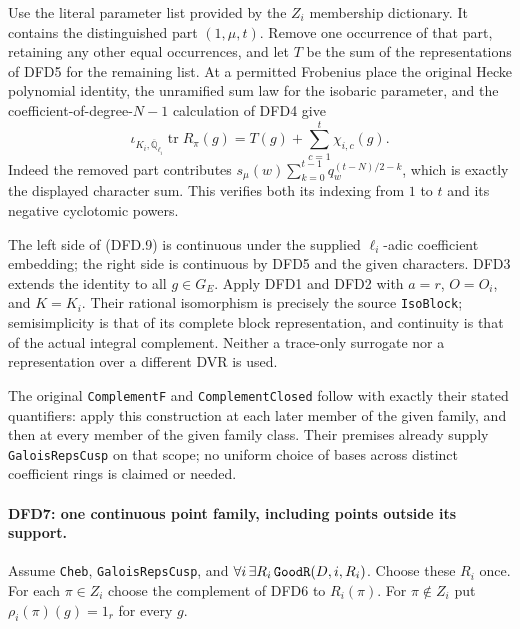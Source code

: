 Use the literal parameter list provided by the $Z_i$ membership
dictionary. It contains the distinguished part $(1,\mu,t)$.
Remove one occurrence of that part, retaining any other equal
occurrences, and let $T$ be the sum of the representations of
DFD5 for the remaining list. At a permitted Frobenius place the
original Hecke polynomial identity, the unramified sum law for
the isobaric parameter, and the coefficient-of-degree-$N-1$
calculation of DFD4 give
\[
 \iota_{K_i,\overline{\mathbb Q}_{\ell_i}}
            \operatorname{tr}R_\pi(g)
       =T(g)+\sum_{c=1}^{t}\chi_{i,c}(g).                \tag{DFD.9}
\]
Indeed the removed part contributes
$s_\mu(w)\sum_{k=0}^{t-1}q_w^{(t-N)/2-k}$, which is exactly
the displayed character sum. This verifies both its indexing
from $1$ to $t$ and its negative cyclotomic powers.

The left side of (DFD.9) is continuous under the supplied
$\ell_i$-adic coefficient embedding; the right side is
continuous by DFD5 and the given characters. DFD3 extends the
identity to all $g\in G_E$. Apply DFD1 and DFD2 with
$a=r$, $O=O_i$, and $K=K_i$. Their rational isomorphism is
precisely the source \texttt{Iso\allowbreak Block}; semisimplicity is that
of its complete block representation, and continuity is that
of the actual integral complement. Neither a trace-only
surrogate nor a representation over a different DVR is used.

The original \texttt{Complement\allowbreak F} and
\texttt{Complement\allowbreak Closed} follow with exactly their stated
quantifiers: apply this construction at each later member of
the given family, and then at every member of the given family
class. Their premises already supply \texttt{Galois\allowbreak Reps\allowbreak Cusp}
on that scope; no uniform choice of bases across distinct
coefficient rings is claimed or needed.

\paragraph{DFD7: one continuous point family, including points outside its support.}
\label{claim:DFD7}
Assume \texttt{Cheb}, \texttt{Galois\allowbreak Reps\allowbreak Cusp}, and
$\forall i\,\exists R_i\,\texttt{Good\allowbreak R}(D,i,R_i)$.
Choose these $R_i$ once. For each $\pi\in Z_i$ choose the
complement of DFD6 to $R_i(\pi)$. For $\pi\notin Z_i$ put
$\rho_i(\pi)(g)=1_r$ for every $g$.

